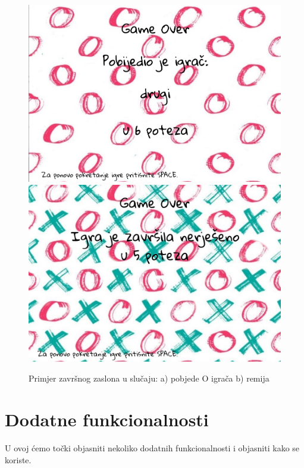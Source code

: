 \documentclass[12pt]{scrartcl}
\begin{document}
\begin{figure}[h]
	\centering
	\includegraphics[scale=0.25]{kraj.png}
	\includegraphics[scale=0.25]{remi.png}
	\caption{Primjer završnog zaslona u slučaju: a) pobjede O igrača b) remija}
	\label{fig:kraj}
\end{figure}


\section{Dodatne funkcionalnosti}\label{sec:funk}

U ovoj ćemo točki objasniti nekoliko dodatnih funkcionalnosti i objasniti kako se koriste.
\end{document}
